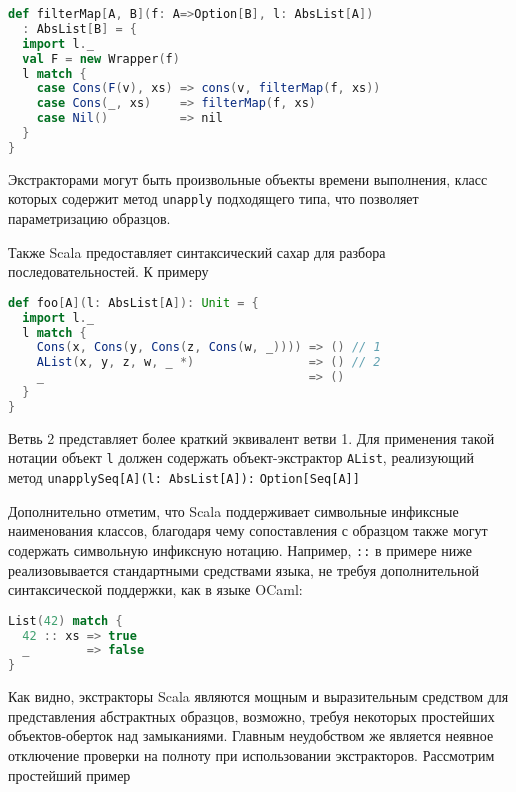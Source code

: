 \noindent
\begin{minipage}{\linewidth}
\begin{lstlisting}[language=scala]
def filterMap[A, B](f: A=>Option[B], l: AbsList[A])
  : AbsList[B] = {
  import l._
  val F = new Wrapper(f)
  l match {
    case Cons(F(v), xs) => cons(v, filterMap(f, xs))
    case Cons(_, xs)    => filterMap(f, xs)
    case Nil()          => nil
  }
}
\end{lstlisting}
\end{minipage}

Экстракторами могут быть произвольные объекты времени выполнения, класс которых содержит метод \lstinline|unapply| подходящего типа, что позволяет параметризацию образцов.

Также Scala предоставляет синтаксический сахар для разбора последовательностей. К примеру

\noindent
\begin{minipage}{\linewidth}
\begin{lstlisting}[language=scala]
def foo[A](l: AbsList[A]): Unit = {
  import l._
  l match {
    Cons(x, Cons(y, Cons(z, Cons(w, _)))) => () // 1
    AList(x, y, z, w, _ *)                => () // 2
    _                                     => ()
  }
}
\end{lstlisting}
\end{minipage}

Ветвь 2 представляет более краткий эквивалент ветви 1. Для применения такой нотации объект \lstinline|l| должен содержать объект-экстрактор \lstinline|AList|, реализующий метод \lstinline[breaklines]|unapplySeq[A](l: AbsList[A]):| \lstinline[breaklines]|Option[Seq[A]]|

Дополнительно отметим, что Scala поддерживает символьные инфиксные наименования классов, благодаря чему сопоставления с образцом также могут содержать символьную инфиксную нотацию. Например, \lstinline|::| в примере ниже реализовывается стандартными средствами языка, не требуя дополнительной синтаксической поддержки, как в языке OCaml:

\noindent
\raggedbottom
\begin{minipage}{\linewidth}
\begin{lstlisting}[language=scala]
List(42) match {
  42 :: xs => true
  _        => false 
}
\end{lstlisting}
\end{minipage}

Как видно, экстракторы Scala являются мощным и выразительным средством для представления абстрактных образцов, возможно, требуя некоторых простейших объектов-оберток над замыканиями. Главным неудобством же является неявное отключение проверки на полноту при использовании экстракторов. Рассмотрим простейший пример


